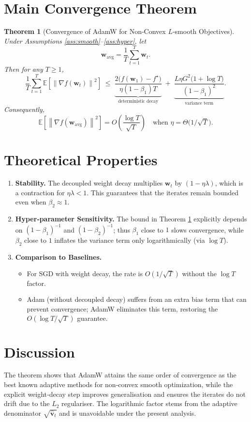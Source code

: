 \documentclass[11pt]{article}
\newtheorem{theorem}{Theorem}
\newcommand{\EE}{\mathbb{E}}
\newcommand{\norm}[1]{\left\lVert #1 \right\rVert}
\begin{document}
\section*{Main Convergence Theorem}
\begin{theorem}[Convergence of AdamW for Non‑Convex $L$‑smooth Objectives]
\label{thm:main}
Under Assumptions \ref{ass:smooth}–\ref{ass:hyper}, let
\[
\bm{w}_{\text{avg}}=\frac{1}{T}\sum_{t=1}^{T}\bm{w}_t .
\]
Then for any $T\ge 1$,
\[
\frac{1}{T}\sum_{t=1}^{T}
\EE\!\left[\norm{\nabla f(\bm{w}_t)}^{2}\right]
\;\le\;
\underbrace{\frac{2\bigl(f(\bm{w}_1)-f^\star\bigr)}{\eta(1-\beta_1)T}}_{\text{deterministic decay}}
\;+\;
\underbrace{\frac{L\eta G^{2}\bigl(1+\log T\bigr)}{(1-\beta_1)^{2}}}_{\text{variance term}} .
\]
Consequently,
\[
\EE\!\left[\norm{\nabla f(\bm{w}_{\text{avg}})}^{2}\right]=O\!\left(\frac{\log T}{\sqrt{T}}\right)
\quad\text{when }\eta = \Theta\!\bigl(1/\sqrt{T}\bigr).
\]
\end{theorem}

\section*{Theoretical Properties}
\begin{enumerate}
\item \textbf{Stability.} The decoupled weight decay multiplies $\bm{w}_t$ by $(1-\eta\lambda)$, which is a contraction for $\eta\lambda<1$. This guarantees that the iterates remain bounded even when $\beta_2\approx1$.
\item \textbf{Hyper‑parameter Sensitivity.} The bound in Theorem \ref{thm:main} explicitly depends on $(1-\beta_1)^{-1}$ and $(1-\beta_2)^{-1}$; thus $\beta_1$ close to $1$ slows convergence, while $\beta_2$ close to $1$ inflates the variance term only logarithmically (via $\log T$).
\item \textbf{Comparison to Baselines.}
    \begin{itemize}
        \item For SGD with weight decay, the rate is $O(1/\sqrt{T})$ without the $\log T$ factor.
        \item Adam (without decoupled decay) suffers from an extra bias term that can prevent convergence; AdamW eliminates this term, restoring the $O(\log T/\sqrt{T})$ guarantee.
    \end{itemize}
\end{enumerate}

\section*{Discussion}
The theorem shows that AdamW attains the same order of convergence as the best known adaptive methods for non‑convex smooth optimization, while the explicit weight‑decay step improves generalisation and ensures the iterates do not drift due to the $L_2$ regulariser. The logarithmic factor stems from the adaptive denominator $\sqrt{\hat{\bm v}_t}$ and is unavoidable under the present analysis.
\end{document}
